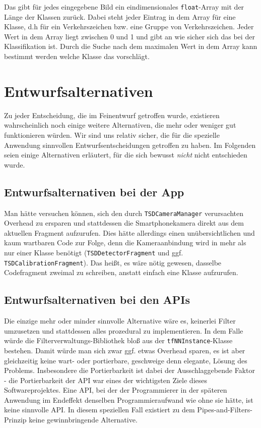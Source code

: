 \documentclass[12pt,a4paper,ngerman,enabledeprecatedfontcommands]{scrreprt}
\begin{document}
Das  gibt für jedes eingegebene Bild ein eindimensionales \texttt{float}-Array mit der Länge der Klassen zurück.
Dabei steht jeder Eintrag in dem Array für eine Klasse, d.h für ein Verkehrszeichen bzw. eine Gruppe von Verkehrszeichen. Jeder Wert in dem Array liegt zwischen 0 und 1 und gibt an wie sicher sich das  bei der \gls{Klassifikation} ist. Durch die Suche nach dem maximalen Wert in dem Array kann bestimmt werden welche Klasse das 
 vorschlägt.



\chapter{Entwurfsalternativen}
Zu jeder Entscheidung, die im Feinentwurf getroffen wurde, existieren wahrscheinlich noch einige weitere Alternativen, die mehr oder weniger gut funktionieren würden. Wir sind uns relativ sicher, die für die spezielle Anwendung sinnvollen Entwurfsentscheidungen getroffen zu haben. Im Folgenden seien einige Alternativen erläutert, für die sich bewusst \textit{nicht} nicht entschieden wurde.\\


\section{Entwurfsalternativen bei der App}
Man hätte versuchen können, sich den durch \texttt{TSDCameraManager} verursachten Overhead zu ersparen und stattdessen die Smartphonekamera direkt aus dem aktuellen Fragment aufzurufen. Dies hätte allerdings einen unübersichtlichen und kaum wartbaren Code zur Folge, denn die Kameraanbindung wird in mehr als nur einer Klasse benötigt (\texttt{TSDDetectorFragment} und ggf. \texttt{TSDCalibrationFragment}). Das heißt, es wäre nötig gewesen, dasselbe Codefragment zweimal zu schreiben, anstatt einfach eine Klasse aufzurufen.\\

\section{Entwurfsalternativen  bei den APIs}
Die einzige mehr oder minder sinnvolle Alternative wäre es, keinerlei Filter umzusetzen und stattdessen alles prozedural zu implementieren. In dem Falle würde die \gls{Filterverwaltungs-Bibliothek} bloß aus der \texttt{tfNNInstance}-Klasse bestehen. Damit würde man sich zwar ggf. etwas Overhead sparen, es ist aber gleichzeitig keine wart- oder portierbare, geschweige denn elegante, Lösung des Problems. Insbesondere die Portierbarkeit ist dabei der Ausschlaggebende Faktor - die Portierbarkeit der \gls{API} war eines der wichtigsten Ziele dieses Softwareprojektes. Eine API, bei der der Programmierer in der späteren Anwendung im Endeffekt denselben Programmieraufwand wie ohne sie hätte, ist keine sinnvolle \gls{API}. In diesem speziellen Fall existiert zu dem Pipes-and-Filters-Prinzip keine gewinnbringende Alternative.\\
\end{document}

